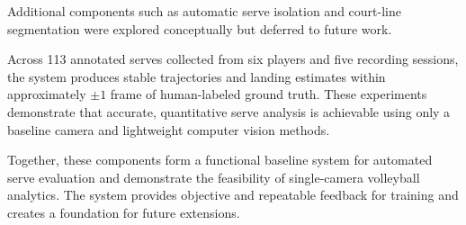 Additional components such as automatic serve isolation and court-line segmentation were explored conceptually but deferred to future work.

Across 113 annotated serves collected from six players and five recording sessions, the system produces stable trajectories and landing estimates within approximately $\pm 1$ frame of human-labeled ground truth. These experiments demonstrate that accurate, quantitative serve analysis is achievable using only a baseline camera and lightweight computer vision methods.

Together, these components form a functional baseline system for automated serve evaluation and demonstrate the feasibility of single-camera volleyball analytics. The system provides objective and repeatable feedback for training and creates a foundation for future extensions.

